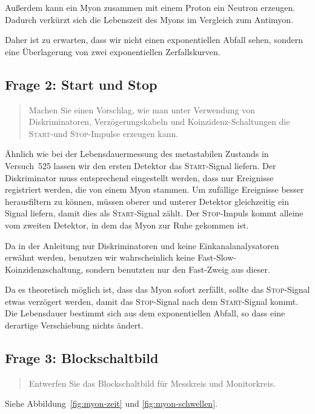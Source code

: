 \documentclass[11pt, ngerman, fleqn, DIV=15, headinclude, BCOR=2cm]{scrreprt}
\begin{document}
Außerdem kann ein Myon zusammen mit einem Proton ein Neutron erzeugen. Dadurch
verkürzt sich die Lebenszeit des Myons im Vergleich zum Antimyon.
\parencite{Rennie/Myon_Decay}

Daher ist zu erwarten, dass wir nicht einen exponentiellen Abfall sehen,
sondern eine Überlagerung von zwei exponentiellen Zerfallskurven.

\subsection{Frage 2: Start und Stop}

\begin{quote}
    Machen Sie einen Vorschlag, wie man unter Verwendung von Diskriminatoren,
    Verzögerungskabeln und Koinzidenz-Schaltungen die \textsc{Start}-und
    \textsc{Stop}-Impulse erzeugen kann.
\end{quote}

Ähnlich wie bei der Lebensdauermessung des metastabilen Zustands in Versuch~525
lassen wir den ersten Detektor das \textsc{Start}-Signal liefern. Der
Diskriminator muss entsprechend eingestellt werden, dass nur Ereignisse
registriert werden, die von einem Myon stammen. Um zufällige Ereignisse besser
herausfiltern zu können, müssen oberer und unterer Detektor gleichzeitig ein
Signal liefern, damit dies als \textsc{Start}-Signal zählt. Der
\textsc{Stop}-Impuls kommt alleine vom zweiten Detektor, in dem das Myon zur
Ruhe gekommen ist.

Da in der Anleitung nur Diskriminatoren und keine Einkanalanalysatoren erwähnt
werden, benutzen wir wahrscheinlich keine Fast-Slow-Koinzidenzschaltung,
sondern benutzten nur den Fast-Zweig aus dieser.

Da es theoretisch möglich ist, dass das Myon sofort zerfällt, sollte das
\textsc{Stop}-Signal etwas verzögert werden, damit das \textsc{Stop}-Signal
nach dem \textsc{Start}-Signal kommt. Die Lebensdauer bestimmt sich aus dem
exponentiellen Abfall, so dass eine derartige Verschiebung nichts ändert.

\subsection{Frage 3: Blockschaltbild}

\begin{quote}
    Entwerfen Sie das Blockschaltbild für Messkreis und Monitorkreis.
\end{quote}

Siehe Abbildung~\ref{fig:myon-zeit} und \ref{fig:myon-schwellen}.
\end{document}
